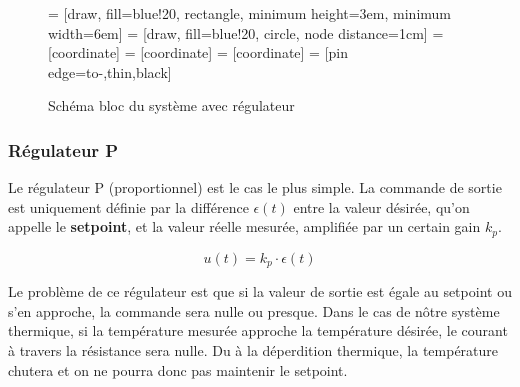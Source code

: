 \begin{figure}[H]	
    \centering
    
     = [draw, fill=blue!20, rectangle, minimum height=3em, minimum width=6em]
     = [draw, fill=blue!20, circle, node distance=1cm]
     = [coordinate]
     = [coordinate]
     = [coordinate]
     = [pin edge={to-,thin,black}]

    \caption{Schéma bloc du système avec régulateur}
\end{figure}

\subsubsection{Régulateur P}
Le régulateur P (proportionnel) est le cas le plus simple.
La commande de sortie est uniquement définie par la différence 
$\epsilon(t)$ entre la valeur désirée, qu'on appelle le \textbf{setpoint}, et
la valeur réelle mesurée, amplifiée par un certain gain $k_p$.

$$u(t) = k_p \cdot \epsilon(t)$$

Le problème de ce régulateur est que si la valeur de sortie est
égale au setpoint ou s'en approche, la commande sera nulle ou
presque. Dans le cas de nôtre système thermique, si la température
mesurée approche la température désirée, le courant à travers la
résistance sera nulle. Du à la déperdition thermique, la température
chutera et on ne pourra donc pas maintenir le setpoint.\\


